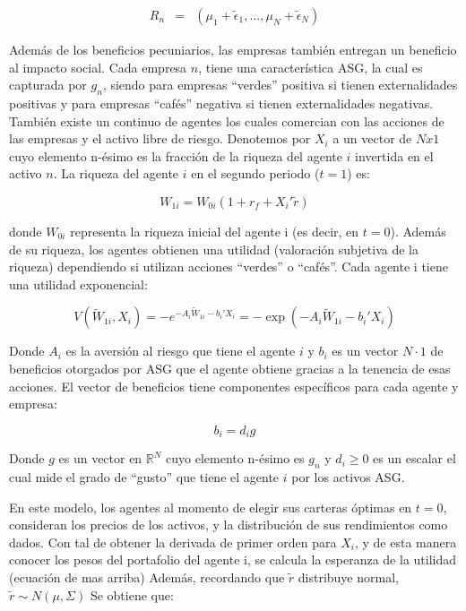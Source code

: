 \begin{eqnarray}
R_n&=&(\mu_1 + \tilde\epsilon_1,...,\mu_N + \tilde\epsilon_N)\label{eq:Rn}
\end{eqnarray}

Además de los beneficios pecuniarios, las empresas también entregan un beneficio al impacto social. Cada empresa $n$, tiene una característica ASG, la cual es capturada por $g_n$, siendo para empresas ``verdes'' positiva si tienen externalidades positivas y para empresas ``cafés'' negativa si tienen externalidades negativas.\\

También existe un continuo de agentes los cuales comercian con las acciones de las empresas y el activo libre de riesgo. Denotemos por $X_i$ a un vector de $N x 1$ cuyo elemento n-ésimo es la fracción de la riqueza del agente $i$ invertida en el activo $n$. La riqueza del agente $i$ en el segundo periodo ($t = 1$) es:

$$W_{1i}=W_{0i}(1 + r_f + X_i' \tilde r)$$

donde $W_{0i}$ representa la riqueza inicial del agente i (es decir, en $t=0$). Además de su riqueza, los agentes obtienen una utilidad (valoración subjetiva de la riqueza) dependiendo si utilizan acciones ``verdes'' o ``cafés''. Cada agente i tiene una utilidad exponencial:

$$V(\tilde W_{1i}, X_i)=-e^{-A_i\tilde W_{1i}-b_i'X_i}=-\exp\left(-A_i\tilde W_{1i}-b_i'X_i\right)$$

Donde $A_i$ es la aversión al riesgo que tiene el agente $i$ y $b_i$ es un vector $N \cdot 1$ de beneficios otorgados por ASG que el agente obtiene gracias a la tenencia de esas acciones. El vector de beneficios tiene componentes específicos para cada agente y empresa:

$$b_i=d_ig$$

Donde $g$ es un vector en $\mathbb{R}^N$ cuyo elemento n-ésimo es $g_n$ y $d_i \geq 0$ es un escalar el cual mide el grado de ``gusto'' que tiene el agente $i$ por los activos ASG. 

En este modelo, los agentes al momento de elegir sus carteras óptimas en $t=0$, consideran los precios de los activos, y la distribución de sus rendimientos como dados. Con tal de obtener la derivada de primer orden para $X_i$, y de esta manera conocer los pesos del portafolio del agente i, se calcula la esperanza de la utilidad (ecuación de mas arriba) Además, recordando que $\tilde r$ distribuye normal, $\tilde r \sim N(\mu, \Sigma)$ Se obtiene que:


